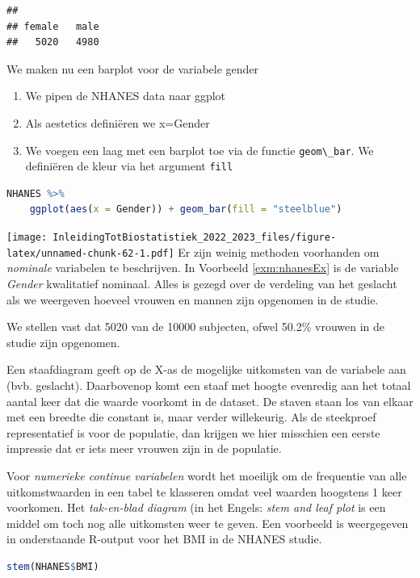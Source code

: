 \documentclass[
  12pt,dutch,coursenotes]{book}
\newcommand{\passthrough}[1]{#1}
\providecommand{\tightlist}{%
  \setlength{\itemsep}{0pt}\setlength{\parskip}{0pt}}
\begin{document}
\begin{lstlisting}
## 
## female   male 
##   5020   4980
\end{lstlisting}

We maken nu een barplot voor de variabele gender

\begin{enumerate}
\def\labelenumi{\arabic{enumi}.}
\tightlist
\item
  We pipen de NHANES data naar ggplot
\item
  Als aestetics definiëren we x=Gender
\item
  We voegen een laag met een barplot toe via de functie \passthrough{\lstinline!geom\_bar!}. We definiëren de kleur via het argument \passthrough{\lstinline!fill!}
\end{enumerate}

\begin{lstlisting}[language=R]
NHANES %>%
    ggplot(aes(x = Gender)) + geom_bar(fill = "steelblue")
\end{lstlisting}

\texttt{[image: InleidingTotBiostatistiek\_2022\_2023\_files/figure-latex/unnamed-chunk-62-1.pdf]}
Er zijn weinig methoden voorhanden om \emph{nominale} variabelen te
beschrijven. In Voorbeeld \ref{exm:nhanesEx} is de variable \emph{Gender}
kwalitatief nominaal.
Alles is gezegd over de verdeling van het geslacht als we weergeven hoeveel vrouwen en mannen zijn opgenomen in de studie.

We stellen vast dat 5020 van de 10000 subjecten, ofwel 50.2\% vrouwen in de studie zijn opgenomen.

Een staafdiagram geeft op de X-as de mogelijke uitkomsten van de variabele
aan (bvb. geslacht). Daarbovenop komt een staaf met hoogte evenredig aan
het totaal aantal keer dat die waarde voorkomt in de dataset. De staven staan los van elkaar met een breedte die constant is, maar verder willekeurig. Als de steekproef
representatief is voor de populatie, dan
krijgen we hier misschien een eerste impressie dat er iets meer vrouwen zijn in de populatie.

Voor \emph{numerieke continue variabelen} wordt het moeilijk om de
frequentie van alle uitkomstwaarden in een tabel te klasseren omdat veel
waarden hoogstens 1 keer voorkomen. Het \emph{tak-en-blad diagram} (in het
Engels: \emph{stem and leaf plot} is een middel om toch nog alle
uitkomsten weer te geven. Een voorbeeld is weergegeven in onderstaande R-output voor het BMI in de NHANES studie.

\begin{lstlisting}[language=R]
stem(NHANES$BMI)
\end{lstlisting}
\end{document}

